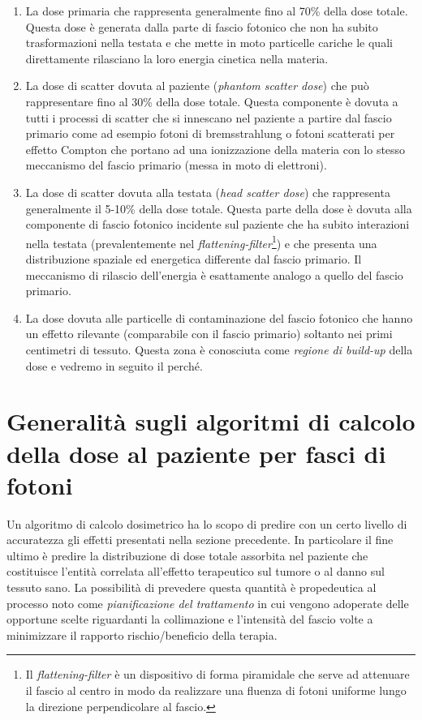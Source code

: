 \begin{enumerate}
\item La dose primaria che rappresenta generalmente fino al 70\% della dose totale. Questa dose è generata dalla parte di fascio fotonico che non ha subito trasformazioni nella testata e che mette in moto particelle cariche le quali direttamente rilasciano la loro energia cinetica nella materia.
\item La dose di scatter dovuta al paziente (\textit{phantom scatter dose}) che può rappresentare fino al 30\% della dose totale. Questa componente è dovuta a tutti i processi di scatter che si innescano nel paziente a partire dal fascio primario come ad esempio fotoni di bremsstrahlung o fotoni scatterati per effetto Compton che portano ad una ionizzazione della materia con lo stesso meccanismo del fascio primario (messa in moto di elettroni).
\item La dose di scatter dovuta alla testata (\textit{head scatter dose}) che rappresenta generalmente il 5-10\% della dose totale. Questa parte della dose è dovuta alla componente di fascio fotonico incidente sul paziente che ha subito interazioni nella testata (prevalentemente nel \textit{flattening-filter}\footnote{Il \textit{flattening-filter} è un dispositivo di forma piramidale che serve ad attenuare il fascio al centro in modo da realizzare una fluenza di fotoni uniforme lungo la direzione perpendicolare al fascio.}) e che presenta una distribuzione spaziale ed energetica differente dal fascio primario. Il meccanismo di rilascio dell'energia è esattamente analogo a quello del fascio primario.
\item La dose dovuta alle particelle di contaminazione del fascio fotonico che hanno un effetto rilevante (comparabile con il fascio primario) soltanto nei primi centimetri di tessuto. Questa zona è conosciuta come \textit{regione di build-up} della dose e vedremo in seguito il perché.
\end{enumerate}


\section{Generalità sugli algoritmi di calcolo della dose al paziente per fasci di fotoni}
Un algoritmo di calcolo dosimetrico ha lo scopo di predire con un certo livello di accuratezza gli effetti presentati nella sezione precedente. In particolare il fine ultimo è predire la distribuzione di dose totale assorbita nel paziente che costituisce l'entità correlata all'effetto terapeutico sul tumore o al danno sul tessuto sano. La possibilità di prevedere questa quantità è propedeutica al processo noto come \textit{pianificazione del trattamento} in cui vengono adoperate delle opportune scelte riguardanti la collimazione e l'intensità del fascio volte a minimizzare il rapporto rischio/beneficio della terapia.

